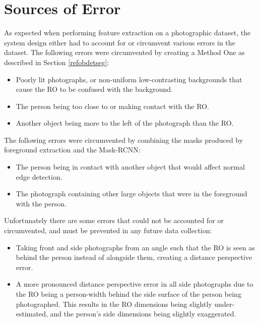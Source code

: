 \documentclass[conference]{IEEEtran}
\begin{document}
\section{Sources of Error} \label{error}
As expected when performing feature extraction on a photographic dataset, the system design either had to account for or circumvent various errors in the dataset.
The following errors were circumvented by creating a Method One as described in Section \ref{refobdetseg}:
\begin{itemize}
	\item Poorly lit photographs, or non-uniform low-contrasting backgrounds that cause the RO to be confused with the background.
	\item The person being too close to or making contact with the RO.
	\item Another object being more to the left of the photograph than the RO.
\end{itemize}
The following errors were circumvented by combining the masks produced by foreground extraction and the Mask-RCNN:
\begin{itemize}
	\item The person being in contact with another object that would affect normal edge detection.
	\item The photograph containing other large objects that were in the foreground with the person.
\end{itemize}
Unfortunately there are some errors that could not be accounted for or circumvented, and must be prevented in any future data collection:
\begin{itemize}
	\item Taking front and side photographs from an angle such that the RO is seen as behind the person instead of alongside them, creating a distance perspective error.
	\item A more pronounced distance perspective error in all side photographs due to the RO being a person-width behind the side surface of the person being photographed.
	This results in the RO dimensions being slightly under-estimated, and the person's side dimensions being slightly exaggerated.
\end{itemize}
\end{document}
